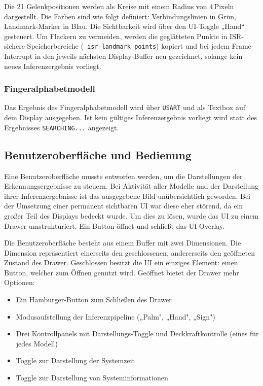 Die 21 Gelenkpositionen werden als Kreise mit einem Radius von 4\,Pixeln dargestellt.
Die Farben sind wie folgt definiert: Verbindungslinien in Grün, Landmark-Marker in Blau. Die Sichtbarkeit wird über den UI-Toggle „Hand“ gesteuert. Um Flackern zu vermeiden, werden die geglätteten Punkte in ISR-sichere Speicherbereiche (\texttt{\_isr\_landmark\_points}) kopiert und bei jedem Frame-Interrupt in den jeweils nächsten Display-Buffer neu gezeichnet, solange kein neues Inferenzergebnis vorliegt.

\subsubsection{Fingeralphabetmodell}\label{ssub:darstellung-fingeralphabet}

Das Ergebnis des Fingeralphabetmodell wird über \texttt{USART} und als Textbox auf dem Display ausgegeben. Ist kein gültiges Inferenzergebnis vorliegt wird statt des Ergebnisses \linebreak \texttt{SEARCHING...} angezeigt.

\subsection{Benutzeroberfläche und Bedienung}\label{sub:benutzeroberflaeche}

Eine Benutzeroberfläche musste entworfen werden, um die Darstellungen der Erkennungsergebnisse zu steuern. Bei Aktivität aller Modelle und der Darstellung ihrer Inferenzergebnisse ist das ausgegebene Bild unübersichtlich geworden. Bei der Umsetzung einer permanent sichtbaren UI war diese eher störend, da ein großer Teil des Displays bedeckt wurde. Um dies zu lösen, wurde das UI zu einem Drawer umstrukturiert. Ein Button öffnet und schließt das UI-Overlay.

Die Benutzeroberfläche besteht aus einem Buffer mit zwei Dimensionen. Die Dimension repräsentiert einerseits den geschlossenen, andererseits den geöffneten Zustand des Drawer.
Geschlossen besitzt die UI ein einziges Element: einen Button, welcher zum Öffnen genutzt wird.
Geöffnet bietet der Drawer mehr Optionen:
\begin{itemize}
    \item Ein Hamburger-Button zum Schließen des Drawer
    \item Modusaufstellung der Inferenzpipeline („Palm", „Hand", „Sign")
    \item Drei Kontrollpanels mit Darstellungs-Toggle und Deckkraftkontrolle (eines für jedes Modell)
    \item Toggle zur Darstellung der Systemzeit
    \item Toggle zur Darstellung von Systeminformationen
\end{itemize}


